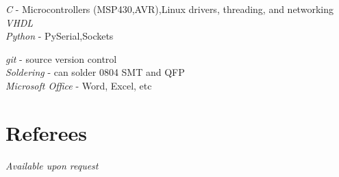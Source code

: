 \documentclass[10pt]{article} %
\begin{document}
{
\textit{C} - Microcontrollers (MSP430,AVR),Linux drivers, threading, and networking\\
\textit{VHDL}\\
\textit{Python} - PySerial,Sockets
}


{
\textit{git} - source version control\\
\textit{Soldering} - can solder 0804 SMT and QFP\\
\textit{Microsoft Office} - Word, Excel, etc
}


\section{Referees}
\iffalse
\parbox{0.5\textwidth}{ %
\begin{tabbing}
\hspace{2.75cm} \= \hspace{4cm} \= \kill %
{\bf Name} \> name \\ %
{\bf Company} \> company \\ %
{\bf Position} \> job \\ %
{\bf Contact} \> \href{mailto:em@il}{em@il} %
\end{tabbing}}
\hfill %
\parbox{0.5\textwidth}{ %
\begin{tabbing}
\hspace{2.75cm} \= \hspace{4cm} \= \kill %
{\bf Name} \> name\\ %
{\bf Company} \> company \\ %
{\bf Position} \> job \\ %
{\bf Contact} \> \href{mailto:em@il}{em@il} %
\end{tabbing}}
\fi
\textit{Available upon request}

\end{document}
